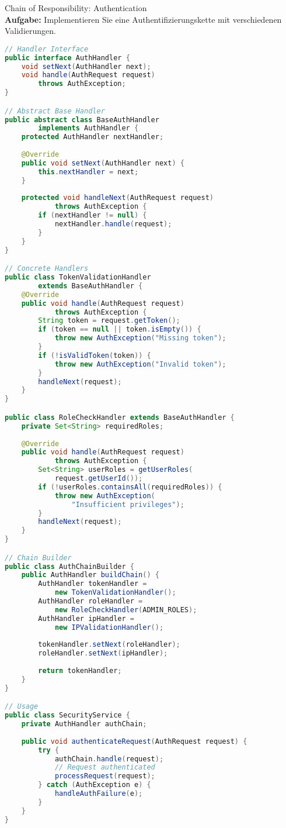 \begin{example2}[breakable]{Chain of Responsibility: Authentication}\\
\textbf{Aufgabe:} Implementieren Sie eine Authentifizierungskette mit verschiedenen Validierungen.

\begin{lstlisting}[language=Java, style=basesmol]
// Handler Interface
public interface AuthHandler {
    void setNext(AuthHandler next);
    void handle(AuthRequest request) 
        throws AuthException;
}

// Abstract Base Handler
public abstract class BaseAuthHandler 
        implements AuthHandler {
    protected AuthHandler nextHandler;
    
    @Override
    public void setNext(AuthHandler next) {
        this.nextHandler = next;
    }
    
    protected void handleNext(AuthRequest request) 
            throws AuthException {
        if (nextHandler != null) {
            nextHandler.handle(request);
        }
    }
}

// Concrete Handlers
public class TokenValidationHandler 
        extends BaseAuthHandler {
    @Override
    public void handle(AuthRequest request) 
            throws AuthException {
        String token = request.getToken();
        if (token == null || token.isEmpty()) {
            throw new AuthException("Missing token");
        }
        if (!isValidToken(token)) {
            throw new AuthException("Invalid token");
        }
        handleNext(request);
    }
}

public class RoleCheckHandler extends BaseAuthHandler {
    private Set<String> requiredRoles;
    
    @Override
    public void handle(AuthRequest request) 
            throws AuthException {
        Set<String> userRoles = getUserRoles(
            request.getUserId());
        if (!userRoles.containsAll(requiredRoles)) {
            throw new AuthException(
                "Insufficient privileges");
        }
        handleNext(request);
    }
}

// Chain Builder
public class AuthChainBuilder {
    public AuthHandler buildChain() {
        AuthHandler tokenHandler = 
            new TokenValidationHandler();
        AuthHandler roleHandler = 
            new RoleCheckHandler(ADMIN_ROLES);
        AuthHandler ipHandler = 
            new IPValidationHandler();
            
        tokenHandler.setNext(roleHandler);
        roleHandler.setNext(ipHandler);
        
        return tokenHandler;
    }
}

// Usage
public class SecurityService {
    private AuthHandler authChain;
    
    public void authenticateRequest(AuthRequest request) {
        try {
            authChain.handle(request);
            // Request authenticated
            processRequest(request);
        } catch (AuthException e) {
            handleAuthFailure(e);
        }
    }
}
\end{lstlisting}
\end{example2}

